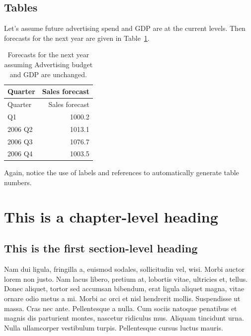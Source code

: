 \documentclass[letterpaper,             %
               oneside,                 %
               \pointsize]              %
               {memoir}
\begin{document}
\hypertarget{tables}{%
\section{Tables}\label{tables}}

Let's assume future advertising spend and GDP are at the current levels.
Then forecasts for the next year are given in
Table~\ref{tbl-salesforecasts}.

\hypertarget{tbl-salesforecasts}{}
\begin{longtable}[]{@{}lr@{}}
\caption{\label{tbl-salesforecasts}Forecasts for the next year assuming
Advertising budget and GDP are unchanged.}\tabularnewline
\toprule\noalign{}
Quarter & Sales forecast \\
\midrule\noalign{}
\endfirsthead
\toprule\noalign{}
Quarter & Sales forecast \\
\midrule\noalign{}
\endhead
\bottomrule\noalign{}
\endlastfoot
2006 Q1 & 1000.2 \\
2006 Q2 & 1013.1 \\
2006 Q3 & 1076.7 \\
2006 Q4 & 1003.5 \\
\end{longtable}

Again, notice the use of labels and references to automatically generate
table numbers.


\hypertarget{sec-style}{%
\chapter{This is a chapter-level heading}\label{sec-style}}

\hypertarget{this-is-the-first-section-level-heading}{%
\section{This is the first section-level
heading}\label{this-is-the-first-section-level-heading}}

Nam dui ligula, fringilla a, euismod sodales, sollicitudin vel, wisi.
Morbi auctor lorem non justo. Nam lacus libero, pretium at, lobortis
vitae, ultricies et, tellus. Donec aliquet, tortor sed accumsan
bibendum, erat ligula aliquet magna, vitae ornare odio metus a mi. Morbi
ac orci et nisl hendrerit mollis. Suspendisse ut massa. Cras nec ante.
Pellentesque a nulla. Cum sociis natoque penatibus et magnis dis
parturient montes, nascetur ridiculus mus. Aliquam tincidunt urna. Nulla
ullamcorper vestibulum turpis. Pellentesque cursus luctus mauris.
\end{document}
